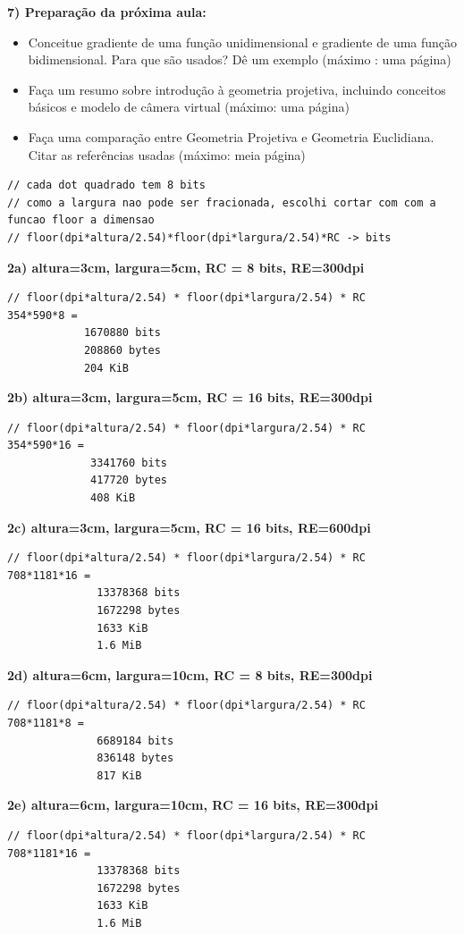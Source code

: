 \documentclass[a4paper]{sbgames}               %
\begin{document}
\textbf{7) Preparação da próxima aula:}
\begin{itemize}
\item Conceitue gradiente de uma função unidimensional e gradiente de uma função bidimensional. Para que são usados? Dê um exemplo (máximo :
uma página)
\item Faça um resumo sobre introdução à geometria projetiva, incluindo
conceitos básicos e modelo de câmera virtual (máximo: uma página)
\item Faça uma comparação entre Geometria Projetiva e Geometria Euclidiana.
Citar as referências usadas (máximo: meia página)
\end{itemize}

\begin{lstlisting}
// cada dot quadrado tem 8 bits
// como a largura nao pode ser fracionada, escolhi cortar com com a funcao floor a dimensao
// floor(dpi*altura/2.54)*floor(dpi*largura/2.54)*RC -> bits
\end{lstlisting}

\textbf{2a) altura=3cm, largura=5cm, RC = 8 bits, RE=300dpi
}\begin{lstlisting}
// floor(dpi*altura/2.54) * floor(dpi*largura/2.54) * RC
354*590*8 =
            1670880 bits
            208860 bytes
            204 KiB
\end{lstlisting}

\textbf{2b) altura=3cm, largura=5cm, RC = 16 bits, RE=300dpi}
\begin{lstlisting}
// floor(dpi*altura/2.54) * floor(dpi*largura/2.54) * RC
354*590*16 =
             3341760 bits
             417720 bytes
             408 KiB
\end{lstlisting}
\pagebreak
\textbf{2c) altura=3cm, largura=5cm, RC = 16 bits, RE=600dpi}
\begin{lstlisting}
// floor(dpi*altura/2.54) * floor(dpi*largura/2.54) * RC
708*1181*16 =
              13378368 bits
              1672298 bytes
              1633 KiB
              1.6 MiB
\end{lstlisting}

\textbf{2d) altura=6cm, largura=10cm, RC = 8 bits, RE=300dpi}
\begin{lstlisting}
// floor(dpi*altura/2.54) * floor(dpi*largura/2.54) * RC
708*1181*8 =
              6689184 bits
              836148 bytes
              817 KiB
\end{lstlisting}

\textbf{2e) altura=6cm, largura=10cm, RC = 16 bits, RE=300dpi}
\begin{lstlisting}
// floor(dpi*altura/2.54) * floor(dpi*largura/2.54) * RC
708*1181*16 =
              13378368 bits
              1672298 bytes
              1633 KiB
              1.6 MiB
\end{lstlisting}
\end{document}

